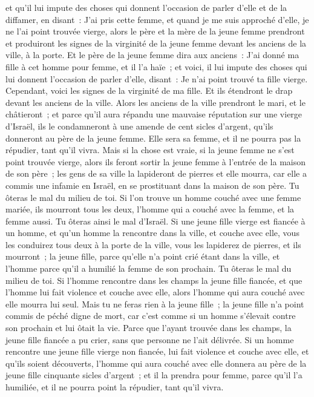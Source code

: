 \begin{multicols}{2}
et qu'il lui impute des choses qui donnent l'occasion de parler d'elle et de la diffamer, en disant~: J'ai pris cette femme, et quand je me suis approché d'elle, je ne l'ai point trouvée vierge,
alors le père et la mère de la jeune femme prendront et produiront les signes de la virginité de la jeune femme devant les anciens de la ville, à la porte.
Et le père de la jeune femme dira aux anciens~: J'ai donné ma fille à cet homme pour femme, et il l'a haïe~;
et voici, il lui impute des choses qui lui donnent l'occasion de parler d'elle, disant~: Je n'ai point trouvé ta fille vierge. Cependant, voici les signes de la virginité de ma fille. Et ils étendront le drap devant les anciens de la ville.
Alors les anciens de la ville prendront le mari, et le châtieront~;
et parce qu'il aura répandu une mauvaise réputation sur une vierge d'Israël, ils le condamneront à une amende de cent sicles d'argent, qu'ils donneront au père de la jeune femme. Elle sera sa femme, et il ne pourra pas la répudier, tant qu'il vivra.
Mais si la chose est vraie, si la jeune femme ne s'est point trouvée vierge,
alors ils feront sortir la jeune femme à l'entrée de la maison de son père~; les gens de sa ville la lapideront de pierres et elle mourra, car elle a commis une infamie en Israël, en se prostituant dans la maison de son père. Tu ôteras le mal du milieu de toi.
Si l'on trouve un homme couché avec une femme mariée, ils mourront tous les deux, l'homme qui a couché avec la femme, et la femme aussi. Tu ôteras ainsi le mal d'Israël.
Si une jeune fille vierge est fiancée à un homme, et qu'un homme la rencontre dans la ville, et couche avec elle,
vous les conduirez tous deux à la porte de la ville, vous les lapiderez de pierres, et ils mourront~; la jeune fille, parce qu'elle n'a point crié étant dans la ville, et l'homme parce qu'il a humilié la femme de son prochain. Tu ôteras le mal du milieu de toi.
Si l'homme rencontre dans les champs la jeune fille fiancée, et que l'homme lui fait violence et couche avec elle, alors l'homme qui aura couché avec elle mourra lui seul.
Mais tu ne feras rien à la jeune fille~; la jeune fille n'a point commis de péché digne de mort, car c'est comme si un homme s'élevait contre son prochain et lui ôtait la vie.
Parce que l'ayant trouvée dans les champs, la jeune fille fiancée a pu crier, sans que personne ne l'ait délivrée.
Si un homme rencontre une jeune fille vierge non fiancée, lui fait violence et couche avec elle, et qu'ils soient découverts,
l'homme qui aura couché avec elle donnera au père de la jeune fille cinquante sicles d'argent~; et il la prendra pour femme, parce qu'il l'a humiliée, et il ne pourra point la répudier, tant qu'il vivra.

\end{multicols}
